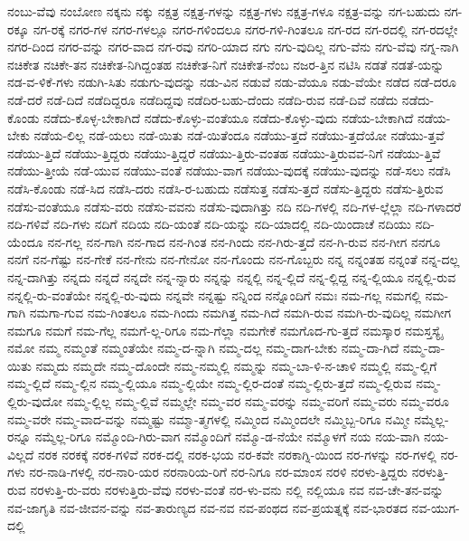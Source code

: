 {ನಂಬು-ವೆವು
ನಂಬೋಣ
ನಕ್ಕನು
ನಕ್ಕು
ನಕ್ಷತ್ರ
ನಕ್ಷತ್ರ-ಗಳನ್ನು
ನಕ್ಷತ್ರ-ಗಳು
ನಕ್ಷತ್ರ-ಗಳೂ
ನಕ್ಷತ್ರ-ವನ್ನು
ನಗ-ಬಹುದು
ನಗ-ರಕ್ಕೂ
ನಗ-ರಕ್ಕೆ
ನಗರ-ಗಳ
ನಗರ-ಗಳಲ್ಲೂ
ನಗರ-ಗಳಿಂದಲೂ
ನಗರ-ಗಳಿ-ಗಿಂತಲೂ
ನಗ-ರದ
ನಗ-ರದಲ್ಲಿ
ನಗ-ರದಲ್ಲೇ
ನಗರ-ದಿಂದ
ನಗರ-ವನ್ನು
ನಗರ-ವಾದ
ನಗ-ರವು
ನಗರಿ-ಯಾದ
ನಗು
ನಗು-ವುದಿಲ್ಲ
ನಗು-ವೆನು
ನಗು-ವೆವು
ನಗ್ನ-ನಾಗಿ
ನಚಿಕೇತ
ನಚಿಕೇ-ತನ
ನಚಿಕೇತ-ನಿಗಿದ್ದಂತಹ
ನಚಿಕೇತ-ನಿಗೆ
ನಚಿಕೇತ-ನೆಂಬ
ನಜರ-ತ್ತಿನ
ನಟಿಸಿ
ನಡತೆ
ನಡತೆ-ಯನ್ನು
ನಡ-ವ-ಳಿಕೆ-ಗಳು
ನಡುಗಿ-ಸಿತು
ನಡುಗು-ವುದನ್ನು
ನಡು-ವಿನ
ನಡುವೆ
ನಡು-ವೆಯೂ
ನಡು-ವೆಯೇ
ನಡೆದ
ನಡೆ-ದರೂ
ನಡೆ-ದರೆ
ನಡೆ-ದಿದೆ
ನಡೆದಿದ್ದರೂ
ನಡೆದಿದ್ದವು
ನಡೆದಿರ-ಬಹು-ದೆಂದು
ನಡೆದಿ-ರುವ
ನಡೆ-ದಿವೆ
ನಡೆದು
ನಡೆದು-ಕೊಂಡು
ನಡೆದು-ಕೊಳ್ಳ-ಬೇಕಾಗಿದೆ
ನಡೆದು-ಕೊಳ್ಳು-ವಂತೆಯೂ
ನಡೆದು-ಕೊಳ್ಳು-ವುದು
ನಡೆಯ-ಬೇಕಾಗಿದೆ
ನಡೆಯ-ಬೇಕು
ನಡೆಯ-ಲಿಲ್ಲ
ನಡೆ-ಯಲು
ನಡೆ-ಯಿತು
ನಡೆ-ಯಿತೆಂದೂ
ನಡೆಯು-ತ್ತದೆ
ನಡೆಯು-ತ್ತದೆಯೋ
ನಡೆಯು-ತ್ತವೆ
ನಡೆಯು-ತ್ತಿದೆ
ನಡೆಯು-ತ್ತಿದ್ದರು
ನಡೆಯು-ತ್ತಿದ್ದರೆ
ನಡೆಯು-ತ್ತಿರು-ವಂತಹ
ನಡೆಯು-ತ್ತಿರುವವ-ನಿಗೆ
ನಡೆಯು-ತ್ತಿವೆ
ನಡೆಯು-ತ್ತೀಯೆ
ನಡೆ-ಯುವ
ನಡೆಯು-ವಂತೆ
ನಡೆಯು-ವಾಗ
ನಡೆಯು-ವುದಕ್ಕೆ
ನಡೆಯು-ವುದನ್ನು
ನಡೆ-ಸಲು
ನಡೆಸಿ
ನಡೆಸಿ-ಕೊಂಡು
ನಡೆ-ಸಿದ
ನಡೆಸಿ-ದರು
ನಡೆಸಿ-ರ-ಬಹುದು
ನಡೆಸುತ್ತ
ನಡೆಸು-ತ್ತದೆ
ನಡೆಸು-ತ್ತಿದ್ದರು
ನಡೆಸು-ತ್ತಿರುವ
ನಡೆಸು-ವಂತೆಯೂ
ನಡೆಸು-ವರು
ನಡೆಸು-ವವನು
ನಡೆಸು-ವುದಾಗಿತ್ತು
ನದಿ
ನದಿ-ಗಳಲ್ಲಿ
ನದಿ-ಗಳ-ಲ್ಲೆಲ್ಲಾ
ನದಿ-ಗಳಾದರೆ
ನದಿ-ಗಳಿವೆ
ನದಿ-ಗಳು
ನದಿಗೆ
ನದಿಯ
ನದಿ-ಯಂತೆ
ನದಿ-ಯನ್ನು
ನದಿ-ಯಾದಲ್ಲಿ
ನದಿ-ಯಿಂದಾಚೆ
ನದಿಯು
ನದಿ-ಯೆಂದೂ
ನನ-ಗಲ್ಲ
ನನ-ಗಾಗಿ
ನನ-ಗಾದ
ನನ-ಗಿಂತ
ನನ-ಗಿಂದು
ನನ-ಗಿರು-ತ್ತದೆ
ನನ-ಗಿ-ರುವ
ನನ-ಗೀಗ
ನನಗೂ
ನನಗೆ
ನನ-ಗೆಷ್ಟು
ನನ-ಗೇಕೆ
ನನ-ಗೇನು
ನನ-ಗೇನೋ
ನನ-ಗೊಂದು
ನನ-ಗೊಬ್ಬರು
ನನ್ನ
ನನ್ನಂತಹ
ನನ್ನಂತೆ
ನನ್ನ-ದಲ್ಲ
ನನ್ನ-ದಾಗಿತ್ತು
ನನ್ನದು
ನನ್ನದೆ
ನನ್ನದೇ
ನನ್ನ-ನ್ನಾರು
ನನ್ನನ್ನು
ನನ್ನಲ್ಲಿ
ನನ್ನ-ಲ್ಲಿದೆ
ನನ್ನ-ಲ್ಲಿದ್ದ
ನನ್ನ-ಲ್ಲಿಯೂ
ನನ್ನಲ್ಲಿ-ರುವ
ನನ್ನಲ್ಲಿ-ರು-ವಂತೆಯೇ
ನನ್ನಲ್ಲಿ-ರು-ವುದು
ನನ್ನವೇ
ನನ್ನಷ್ಟು
ನನ್ನಿಂದ
ನನ್ನೊಂದಿಗೆ
ನಮಃ
ನಮ-ಗಲ್ಲ
ನಮಗಲ್ಲಿ
ನಮ-ಗಾಗಿ
ನಮಗಾ-ಗುವ
ನಮ-ಗಿಂತಲೂ
ನಮ-ಗಿಂದು
ನಮಗಿತ್ತ
ನಮ-ಗಿದೆ
ನಮಗಿ-ರುವ
ನಮಗಿ-ರು-ವುದಿಲ್ಲ
ನಮಗೀಗ
ನಮಗೂ
ನಮಗೆ
ನಮ-ಗೆಲ್ಲ
ನಮಗೆ-ಲ್ಲ-ರಿಗೂ
ನಮ-ಗೆಲ್ಲಾ
ನಮಗೇಕೆ
ನಮಗೊದ-ಗು-ತ್ತದೆ
ನಮಸ್ಕಾರ
ನಮಸ್ತಸ್ಯೈ
ನಮೋ
ನಮ್ಮ
ನಮ್ಮಂತೆ
ನಮ್ಮಂತೆಯೇ
ನಮ್ಮ-ದ-ನ್ನಾಗಿ
ನಮ್ಮ-ದಲ್ಲ
ನಮ್ಮ-ದಾಗ-ಬೇಕು
ನಮ್ಮ-ದಾ-ಗಿದೆ
ನಮ್ಮ-ದಾ-ಯಿತು
ನಮ್ಮದು
ನಮ್ಮದೇ
ನಮ್ಮ-ದೊಂದೇ
ನಮ್ಮ-ನಮ್ಮಲ್ಲಿ
ನಮ್ಮನ್ನು
ನಮ್ಮ-ಬಾ-ಳಿ-ನ-ಚಾಳಿ
ನಮ್ಮಲ್ಲಿ
ನಮ್ಮ-ಲ್ಲಿಗೆ
ನಮ್ಮ-ಲ್ಲಿದೆ
ನಮ್ಮ-ಲ್ಲಿನ
ನಮ್ಮ-ಲ್ಲಿಯೂ
ನಮ್ಮ-ಲ್ಲಿಯೇ
ನಮ್ಮ-ಲ್ಲಿರ-ದಂತೆ
ನಮ್ಮ-ಲ್ಲಿರು-ತ್ತದೆ
ನಮ್ಮ-ಲ್ಲಿರುವ
ನಮ್ಮ-ಲ್ಲಿರು-ವುದೋ
ನಮ್ಮ-ಲ್ಲಿಲ್ಲ
ನಮ್ಮ-ಲ್ಲಿವೆ
ನಮ್ಮಲ್ಲೇ
ನಮ್ಮ-ವರ
ನಮ್ಮ-ವರನ್ನು
ನಮ್ಮ-ವರಿಗೆ
ನಮ್ಮ-ವರು
ನಮ್ಮ-ವರೂ
ನಮ್ಮ-ವರೇ
ನಮ್ಮ-ವಾದ-ವನ್ನು
ನಮ್ಮಷ್ಟು
ನಮ್ಮಾ-ತ್ಮಗಳಲ್ಲಿ
ನಮ್ಮಿಂದ
ನಮ್ಮಿಂದಲೇ
ನಮ್ಮಿಬ್ಬ-ರಿಗೂ
ನಮ್ಮೀ
ನಮ್ಮೆಲ್ಲ-ರನ್ನೂ
ನಮ್ಮೆಲ್ಲ-ರಿಗೂ
ನಮ್ಮೊಂದಿ-ಗಿರು-ವಾಗ
ನಮ್ಮೊಂದಿಗೆ
ನಮ್ಮೊ-ಡ-ನೆಯೇ
ನಮ್ಮೊಳಗೆ
ನಯ
ನಯ-ವಾಗಿ
ನಯ-ವಿಲ್ಲದೆ
ನರಕ
ನರಕಕ್ಕೆ
ನರಕ-ಗಳಿವೆ
ನರಕ-ದಲ್ಲಿ
ನರಕ-ಭಯ
ನರ-ಕವೇ
ನರಕಾಗ್ನಿ-ಯಿಂದ
ನರ-ಗಳನ್ನು
ನರ-ಗಳಲ್ಲಿ
ನರ-ಗಳು
ನರ-ನಾಡಿ-ಗಳಲ್ಲಿ
ನರ-ನಾರಿ-ಯರ
ನರನಾರಿಯ-ರಿಗೆ
ನರ-ನಿಗೂ
ನರ-ಮಾಂಸ
ನರಳಿ
ನರಳು-ತ್ತಿದ್ದರು
ನರಳುತ್ತಿ-ರುವ
ನರಳುತ್ತಿ-ರು-ವರು
ನರಳುತ್ತಿರು-ವೆವು
ನರಳು-ವಂತೆ
ನರ-ಳು-ವನು
ನಲ್ಲಿ
ನಲ್ಲಿಯೂ
ನವ
ನವ-ಚೇ-ತನ-ವನ್ನು
ನವ-ಜಾಗೃತಿ
ನವ-ಜೀವನ-ವನ್ನು
ನವ-ತಾರುಣ್ಯದ
ನವ-ನವ
ನವ-ಪಂಥದ
ನವ-ಪ್ರಯತ್ನಕ್ಕೆ
ನವ-ಭಾರತದ
ನವ-ಯುಗ-ದಲ್ಲಿ
}
